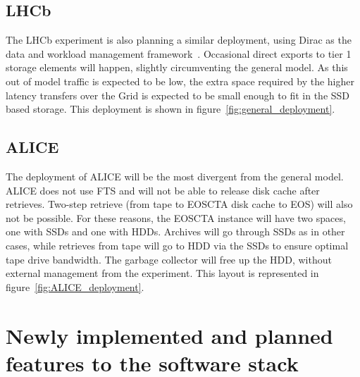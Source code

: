 \documentclass{webofc}
\begin{document}
\subsection{LHCb}

The LHCb experiment is also planning a similar deployment, using Dirac as the data and workload management framework~\cite{dirac}.
Occasional direct exports
to tier 1 storage elements will happen, slightly circumventing the general model. As this out of model traffic
is expected to be low, the extra space required by the higher latency transfers over the Grid is expected
to be small enough to fit in the SSD based storage. This deployment is shown in figure~\ref{fig:general_deployment}.

\subsection{ALICE}

The deployment of ALICE will be the most divergent from the general model. ALICE does not use
FTS and will not be able to release disk cache after retrieves. Two-step retrieve (from tape to
EOSCTA disk cache to EOS) will also not be possible. For these reasons, the EOSCTA instance will
have two spaces, one with SSDs and one with HDDs. Archives will go through SSDs as in other cases,
while retrieves from tape will go to HDD via the SSDs to ensure optimal tape drive bandwidth. 
The garbage collector will free up the HDD, without external management from the
experiment. This layout is represented in figure~\ref{fig:ALICE_deployment}.

\section{Newly implemented and planned features to the software stack}
%
\end{document}
